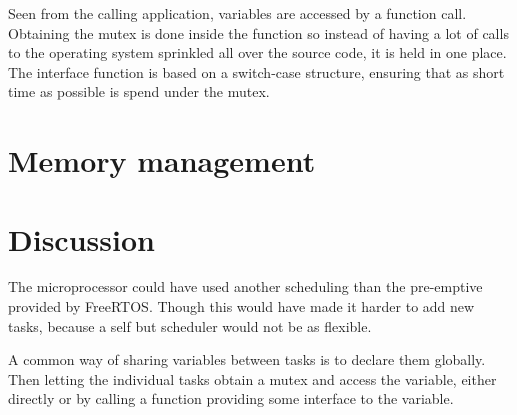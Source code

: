 Seen from the calling application, variables are accessed by a function call.
Obtaining the mutex is done inside the function so instead of having a lot of
calls to the operating system sprinkled all over the source code, it is held in
one place. The interface function is based on a switch-case structure, ensuring
that as short time as possible is spend under the mutex.


\section{Memory management}\label{sec:memoryman}


%
%

\section{Discussion}
The microprocessor could have used another scheduling than the pre-emptive
 provided by FreeRTOS. Though this would have made it harder to add new tasks, because a self but scheduler would not be as flexible.

A common way of sharing variables between tasks is to declare them globally.
Then letting the individual tasks obtain a mutex and access the variable, either
directly or by calling a function providing some interface to the variable.

